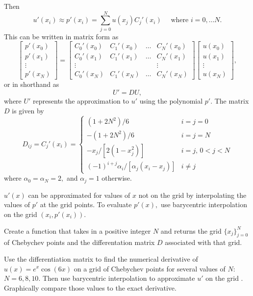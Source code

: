 Then 
\[
u'(x_i) \approx p'(x_i) = \sum_{j=0}^N u(x_j)C_j'(x_i) \quad \text{ where } i = 0, \ldots N.
\]
This can be written in matrix form as 
 \begin{equation*}
 	\left[\begin{array}{c}p'(x_0) \\p'(x_1)\\\vdots \\p'(x_N)\end{array}\right] = 
\left[\begin{array}{cccc}C_0'(x_0) & C_1'(x_0) & \ldots & C_N'(x_0) \\C_0'(x_1) & C_1'(x_1) & \ldots & C_N'(x_1) \\\vdots &  &  & \vdots \\C_0'(x_N) & C_1'(x_N) & \ldots & C_N'(x_N)\end{array}\right]
	\left[\begin{array}{c}u(x_0) \\u(x_1)\\\vdots \\u(x_N)\end{array}\right],
 \end{equation*}
or in shorthand as 
\[U' = D U,\]
where $U'$ represents the approximation to $u'$ using the polynomial $p'$.
The matrix $D$ is given by
\begin{equation*}
D_{ij} = C_j'(x_i) = \begin{cases} (1+2N^2)/6 & i=j=0 \\ -(1+2N^2)/6 & i=j=N \\
-x_j/[2(1-x_j^2)] & i=j, \, 0<j<N \\ 
(-1)^{i+j}\alpha_i/[\alpha_j(x_i-x_j)] & i \not = j
   \end{cases}
\end{equation*}
where $\alpha_0 = \alpha_N = 2,$ and $\alpha_j = 1$ otherwise. 

$u'(x)$ can be approximated for values of $x$ not on the grid by interpolating the values of $p'$ at the grid points.
To evaluate $p'(x),$ use barycentric interpolation on the grid $(x_i,p'(x_i))$.

\begin{problem}
	Create a function  that takes in a positive integer $N$ and returns the grid $\{x_j\}_{j=0}^N$ of Chebychev points and the differentation matrix $D$ associated with that grid. 
	
	Use the differentiation matrix to find the numerical derivative of $u(x) = e^{x}\cos(6x)$ on a grid of Chebychev points for several values of $N:$ $N=6, 8, 10.$
	 Then use barycentric interpolation to approximate $u'$ on the grid . Graphically compare those values to the exact derivative. 
\end{problem}


